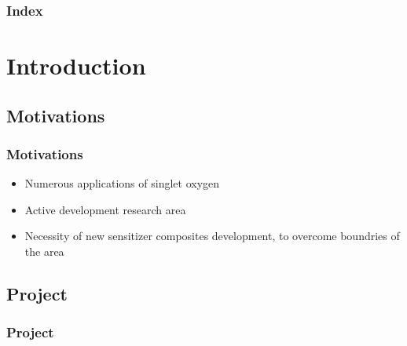 \documentclass[aspectratio=169,fleqn,table]{beamer}
\begin{document}


\begin{frame}[plain]
	
    \titlepage
  
\end{frame}




\begin{frame}[plain]
\frametitle{Index}

\hfill
\parbox[t]{.55\textwidth}{
    \scriptsize
    \begin{minipage}[c][0.4\textheight]{\textwidth}
    \tableofcontents
    \end{minipage}
    
}
\end{frame}



\section{Introduction}


\subsection{Motivations}
\begin{frame}
\frametitle{Motivations}

\begin{itemize}
    \item
    Numerous applications of singlet oxygen
    \item
    Active development research area
    \item
    Necessity of new sensitizer composites development, to overcome boundries of the area
\end{itemize}

\end{frame}


\subsection {Project}
\begin{frame}[plain]
\frametitle{Project}

\vspace{-35pt}
\begin{figure}[border=1pt]
\end{figure}

\end{frame}
\end{document}
